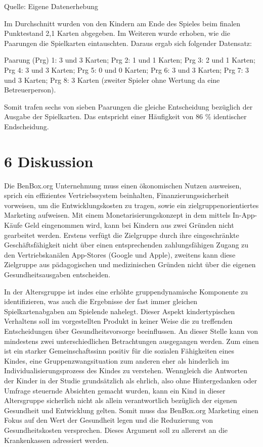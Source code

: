 \documentclass[
  a4paper,
  DIV=11,
  numbers=noendperiod,
  onecolumn,
  oneside,
  a4paper]{scrartcl}
\begin{document}
Quelle: Eigene Datenerhebung

Im Durchschnitt wurden von den Kindern am Ende des Spieles beim finalen
Punktestand 2,1 Karten abgegeben. Im Weiteren wurde erhoben, wie die
Paarungen die Spielkarten eintauschten. Daraus ergab sich folgender
Datensatz:

Paarung (Prg) 1: 3 und 3 Karten; Prg 2: 1 und 1 Karten; Prg 3: 2 und 1
Karten; Prg 4: 3 und 3 Karten; Prg 5: 0 und 0 Karten; Prg 6: 3 und 3
Karten; Prg 7: 3 und 3 Karten; Prg 8: 3 Karten (zweiter Spieler ohne
Wertung da eine Betreuerperson).

Somit trafen sechs von sieben Paarungen die gleiche Entscheidung
bezüglich der Ausgabe der Spielkarten. Das entspricht einer Häufigkeit
von 86 \% identischer Endscheidung.

\section{6 Diskussion}\label{diskussion}

Die BenBox.org Unternehmung muss einen ökonomischen Nutzen ausweisen,
sprich ein effizientes Vertriebssystem beinhalten,
Finanzierungssicherheit vorweisen, um die Entwicklungskosten zu tragen,
sowie ein zielgruppenorientiertes Marketing aufweisen. Mit einem
Monetarisierungskonzept in dem mittels In-App-Käufe Geld eingenommen
wird, kann bei Kindern aus zwei Gründen nicht gearbeitet werden. Erstens
verfügt die Zielgruppe durch ihre eingeschränkte Geschäftsfähigkeit
nicht über einen entsprechenden zahlungsfähigen Zugang zu den
Vertriebskanälen App-Stores (Google und Apple), zweitens kann diese
Zielgruppe aus pädagogischen und medizinischen Gründen nicht über die
eigenen Gesundheitsausgaben entscheiden.

In der Altersgruppe ist indes eine erhöhte gruppendynamische Komponente
zu identifizieren, was auch die Ergebnisse der fast immer gleichen
Spielkartenabgaben am Spielende nahelegt. Dieser Aspekt kindertypischen
Verhaltens soll im vorgestellten Produkt in keiner Weise die zu
treffenden Entscheidungen über Gesundheitsvorsorge beeinflussen. An
dieser Stelle kann von mindestens zwei unterschiedlichen Betrachtungen
ausgegangen werden. Zum einen ist ein starker Gemeinschaftssinn positiv
für die sozialen Fähigkeiten eines Kindes, eine Gruppenzwangsituation
zum anderen eher als hinderlich im Individualisierungsprozess des Kindes
zu verstehen. Wenngleich die Antworten der Kinder in der Studie
grundsätzlich als ehrlich, also ohne Hintergedanken oder Umfrage
steuernde Absichten gemacht wurden, kann ein Kind in dieser Altersgruppe
sicherlich nicht als allein verantwortlich bezüglich der eigenen
Gesundheit und Entwicklung gelten. Somit muss das BenBox.org Marketing
einen Fokus auf den Wert der Gesundheit legen und die Reduzierung von
Gesundheitskosten versprechen. Dieses Argument soll zu allererst an die
Krankenkassen adressiert werden.
\end{document}
